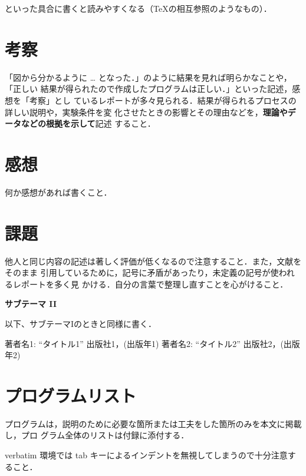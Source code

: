 \documentclass[a4j]{jsarticle}  %
\begin{document}
\bigskip \noindent
といった具合に書くと読みやすくなる（\TeX の相互参照のようなもの）．

\section{考察}
「図から分かるように … となった．」のように結果を見れば明らかなことや，「正しい
結果が得られたので作成したプログラムは正しい．」といった記述，感想を「考察」とし
ているレポートが多々見られる．結果が得られるプロセスの詳しい説明や，実験条件を変
化させたときの影響とその理由などを，\textbf{理論やデータなどの根拠を示して}記述
すること．

\section{感想}
何か感想があれば書くこと．

\section{課題}
他人と同じ内容の記述は著しく評価が低くなるので注意すること．また，文献をそのまま
引用しているために，記号に矛盾があったり，未定義の記号が使われるレポートを多く見
かける．自分の言葉で整理し直すことを心がけること．

\newpage
\begin{center}
 {\Large \bf サブテーマ II}
\end{center}

以下、サブテーマIのときと同様に書く．

\begin{thebibliography}{9}
著者名1: ``タイトル1'' 出版社1，(出版年1)
著者名2: ``タイトル2'' 出版社2，(出版年2)
\end{thebibliography}


\appendix
\section{プログラムリスト}
プログラムは，説明のために必要な箇所または工夫をした箇所のみを本文に掲載し，プロ
グラム全体のリストは付録に添付する．

verbatim 環境では tab キーによるインデントを無視してしまうので十分注意すること．

\newpage
\end{document}
